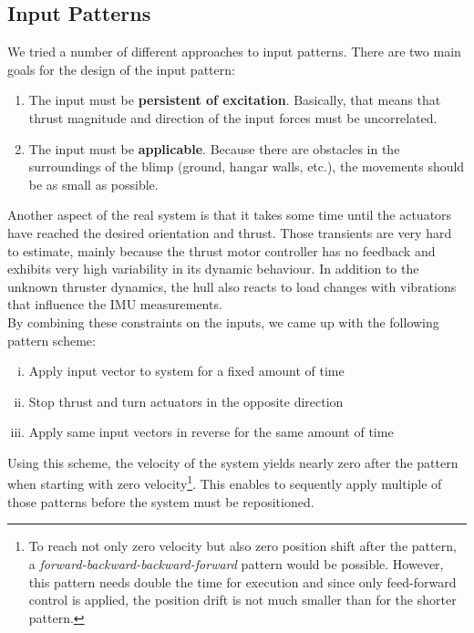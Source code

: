 \subsection{Input Patterns}
\label{sub:input_pattern}
We tried a number of different approaches to input patterns.
There are two main goals for the design of the input pattern:
\begin{enumerate}
\item The input must be \textbf{persistent of excitation}. Basically, that means that thrust magnitude and direction of the input forces must be uncorrelated.
\item The input must be \textbf{applicable}. Because there are obstacles in the surroundings of the blimp (ground, hangar walls, etc.), the movements should be as small as possible.
\end{enumerate}

Another aspect of the real system is that it takes some time until the actuators have reached the desired orientation and thrust.
Those transients are very hard to estimate, mainly because the thrust motor controller has no feedback and exhibits very high variability in its dynamic behaviour.
In addition to the unknown thruster dynamics, the hull also reacts to load changes with vibrations that influence the IMU measurements. \\

By combining these constraints on the inputs, we came up with the following pattern scheme:
\begin{enumerate}[(i)]
\item Apply input vector to system for a fixed amount of time
\item Stop thrust and turn actuators in the opposite direction
\item Apply same input vectors in reverse for the same amount of time
\end{enumerate}
Using this scheme, the velocity of the system yields nearly zero after the pattern when starting with zero velocity\footnote{To reach not only zero velocity but also zero position shift after the pattern, a \textit{forward-backward-backward-forward} pattern would be possible. However, this pattern needs double the time for execution and since only feed-forward control is applied, the position drift is not much smaller than for the shorter pattern.
}.
This enables to sequently apply multiple of those patterns before the system must be repositioned.
\\

